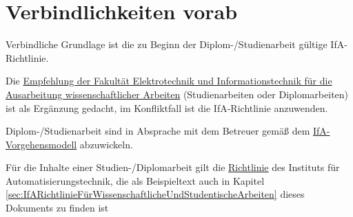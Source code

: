 
\chapter{Verbindlichkeiten vorab}
\label{sec:VerbindlichkeitenVorab}

\begin{compactitem}
  \item Verbindliche Grundlage ist die zu Beginn der Diplom-/Studienarbeit gültige IfA-Richtlinie.
  \item Die \href{http://www.et.tu-dresden.de/etit/uploads/media/EmpfehlungWissenschArbeiten2010_04.pdf}{Empfehlung der Fakultät Elektrotechnik und Informationstechnik für die Ausarbeitung wissenschaftlicher Arbeiten} (Studienarbeiten oder Diplomarbeiten) ist als Ergänzung gedacht, im Konfliktfall ist die IfA-Richtlinie anzuwenden.
  \item Diplom-/Studienarbeit sind in Absprache mit dem Betreuer gemäß dem \href{http://www.et.tu-dresden.de/ifa/index.php?id=331&L=1?keepThis=true}{IfA-Vorgehensmodell} abzuwickeln.
  \item Für die Inhalte einer Studien-/Diplomarbeit gilt die \href{http://www.et.tu-dresden.de/ifa/index.php?id=336&L=1?keepThis=true}{Richtlinie} des Instituts für Automatisierungstechnik, die als Beispieltext auch in Kapitel \ref{sec:IfARichtlinieFürWissenschaftlicheUndStudentischeArbeiten} dieses Dokuments zu finden ist
\end{compactitem}